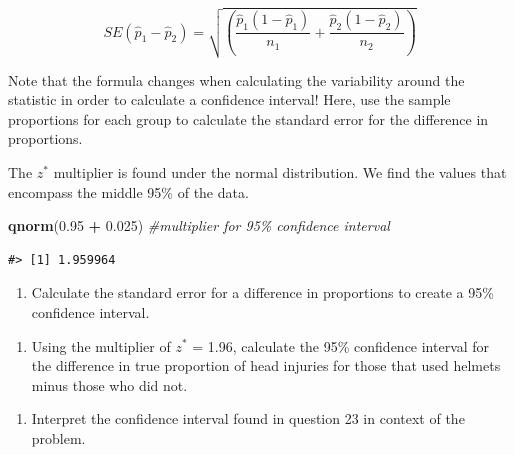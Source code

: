 \documentclass[
]{report}
\newenvironment{Shaded}{\begin{snugshade}}{\end{snugshade}}
\newcommand{\CommentTok}[1]{\textcolor[rgb]{0.56,0.35,0.01}{\textit{#1}}}
\newcommand{\FloatTok}[1]{\textcolor[rgb]{0.00,0.00,0.81}{#1}}
\newcommand{\KeywordTok}[1]{\textcolor[rgb]{0.13,0.29,0.53}{\textbf{#1}}}
\newcommand{\NormalTok}[1]{#1}
\newcommand{\OperatorTok}[1]{\textcolor[rgb]{0.81,0.36,0.00}{\textbf{#1}}}
\newcommand{\StringTok}[1]{\textcolor[rgb]{0.31,0.60,0.02}{#1}}
\providecommand{\tightlist}{%
  \setlength{\itemsep}{0pt}\setlength{\parskip}{0pt}}
\begin{document}
\[SE(\hat{p}_1-\hat{p}_2) = \sqrt{\left(\frac{\hat{p}_1 (1-\hat{p}_1)}{n_1}+\frac{\hat{p}_2 (1-\hat{p}_2)}{n_2}\right)}\]

Note that the formula changes when calculating the variability around the statistic in order to calculate a confidence interval! Here, use the sample proportions for each group to calculate the standard error for the difference in proportions.

The \(z^*\) multiplier is found under the normal distribution. We find the values that encompass the middle 95\% of the data.

\begin{Shaded}
\begin{Highlighting}[]
\KeywordTok{qnorm}\NormalTok{(}\FloatTok{0.95} \OperatorTok{+}\StringTok{ }\FloatTok{0.025}\NormalTok{) }\CommentTok{\#multiplier for 95\% confidence interval}
\end{Highlighting}
\end{Shaded}

\begin{verbatim}
#> [1] 1.959964
\end{verbatim}

\begin{enumerate}
\def\labelenumi{\arabic{enumi}.}
\setcounter{enumi}{21}
\tightlist
\item
  Calculate the standard error for a difference in proportions to create a 95\% confidence interval.
\end{enumerate}

\vspace{1in}

\begin{enumerate}
\def\labelenumi{\arabic{enumi}.}
\setcounter{enumi}{22}
\tightlist
\item
  Using the multiplier of \(z^*\) = 1.96, calculate the 95\% confidence interval for the difference in true proportion of head injuries for those that used helmets minus those who did not.
\end{enumerate}

\vspace{1in}

\begin{enumerate}
\def\labelenumi{\arabic{enumi}.}
\setcounter{enumi}{23}
\tightlist
\item
  Interpret the confidence interval found in question 23 in context of the problem.
\end{enumerate}

\vspace{1in}
\end{document}
